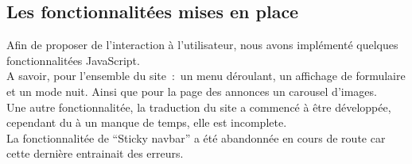 \documentclass[11pt,a4paper]{article}
\begin{document}
\subsection{Les fonctionnalitées mises en place}
Afin de proposer de l'interaction à l'utilisateur, nous avons implémenté quelques fonctionnalitées JavaScript.\\
A savoir, pour l'ensemble du site~:~un menu déroulant, un affichage de formulaire et un mode nuit. Ainsi que pour la page des annonces un carousel d'images.\\
Une autre fonctionnalitée, la traduction du site a commencé à être développée, cependant du à un manque de temps, elle est incomplete.\\
La fonctionnalitée de ``Sticky navbar'' a été abandonnée en cours de route car cette dernière entrainait des erreurs.
\end{document}
